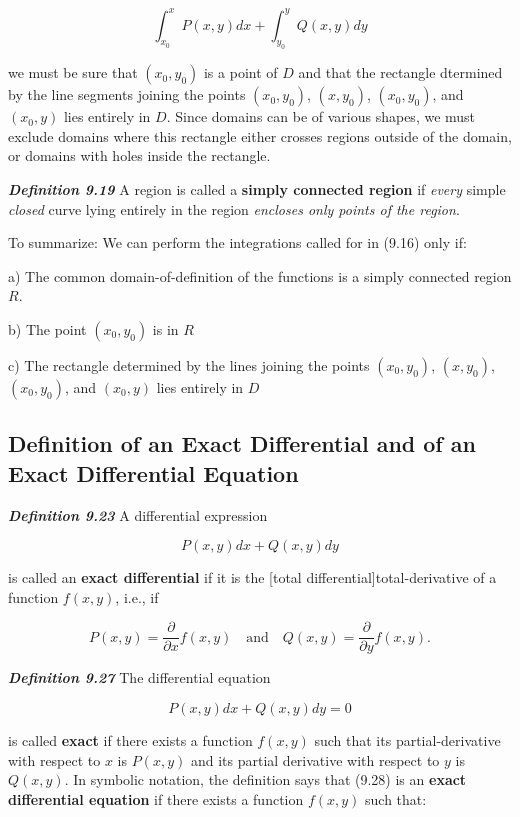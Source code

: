 \documentclass{article}
\begin{document}
\[ \tag{9.16} \int_{x_0}^x P(x,y)dx + \int_{y_0}^y Q(x,y) dy \]

we must be sure that $(x_0,y_0)$ is a point of $D$ and that the rectangle dtermined by the line segments joining the points $(x_0,y_0)$, $(x,y_0)$, $(x_0,y_0)$, and $(x_0,y)$ lies entirely in $D$. Since domains can be of various shapes, we must exclude domains where this rectangle either crosses regions outside of the domain, or domains with holes inside the rectangle.

\emph{\textbf{Definition 9.19}}
A region is called a \textbf{simply connected region} if \emph{every} simple \emph{closed} curve lying entirely in the region \emph{encloses only points of the region}.

To summarize: We can perform the integrations called for in (9.16) only if:

a) The common \@{domain-of-definition} of the functions is a simply connected region $R$.

b) The point $(x_0,y_0)$ is in $R$

c) The rectangle determined by the lines joining the points $(x_0,y_0)$, $(x,y_0)$, $(x_0,y_0)$, and $(x_0,y)$ lies entirely in $D$

\subsection{Definition of an Exact Differential and of an Exact Differential Equation}

\emph{\textbf{Definition 9.23}}  A differential expression

\[ \tag{9.24} P(x,y)dx + Q(x,y)dy \]

is called an \textbf{exact differential} if it is the \@[total differential]{total-derivative} of a function $f(x,y)$, i.e., if

\[ \tag{9.241} P(x,y) = \frac{\partial}{\partial x}f(x,y) \quad \text{and} \quad Q(x,y) = \frac{\partial}{\partial y}f(x,y). \]

\emph{\textbf{Definition 9.27}} The differential equation

\[ \tag{9.28} P(x,y)dx + Q(x,y)dy = 0 \]

is called \textbf{exact} if there exists a function $f(x,y)$ such that its \@{partial-derivative} with respect to $x$ is $P(x,y)$ and its partial derivative with respect to $y$ is $Q(x,y)$. In symbolic notation, the definition says that (9.28) is an \textbf{exact differential equation} if there exists a function $f(x,y)$ such that:
\end{document}

